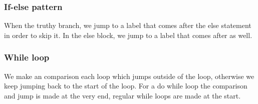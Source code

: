 \subsubsection{If-else pattern}\label{ssub:if_else_pattern}

When the truthy branch, we jump to a label that comes after the else statement in order to skip it.
In the else block, we jump to a label that comes after as well.

\subsubsection{While loop}\label{ssub:while_loop}

We make an comparison each loop which jumps outside of the loop, otherwise we keep jumping back to the start of the loop.
For a do while loop the comparison and jump is made at the very end, regular while loops are made at the start.

